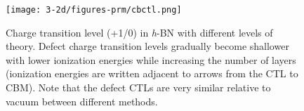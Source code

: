 \begin{figure}
\begin{center}
\texttt{[image: 3-2d/figures-prm/cbctl.png]}


\caption{Charge transition level \cb (+1/0) in \textit{h}-BN with different  levels of theory. Defect charge transition levels gradually become shallower with lower ionization energies while increasing the number of layers (ionization energies are written adjacent to arrows from the CTL to CBM). Note that the defect CTLs are very similar relative to vacuum between different methods.}  \label{fig:ctl2}
\end{center}
\end{figure}



